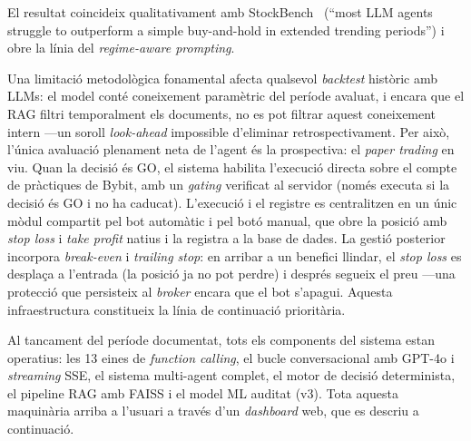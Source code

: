 \documentclass[10pt,twocolumn,a4paper]{article}
\begin{document}
El resultat coincideix qualitativament amb StockBench~\cite{stockbench2025} (``most
LLM agents struggle to outperform a simple buy-and-hold in extended trending
periods'') i obre la línia del \emph{regime-aware prompting}.

Una limitació metodològica fonamental afecta qualsevol \textit{backtest} històric
amb LLMs: el model conté coneixement paramètric del període avaluat, i encara que
el RAG filtri temporalment els documents, no es pot filtrar aquest coneixement
intern ---un soroll \textit{look-ahead} impossible d'eliminar retrospectivament. Per
això, l'única avaluació plenament neta de l'agent és la prospectiva: el
\textit{paper trading} en viu. Quan la decisió és GO, el sistema habilita l'execució
directa sobre el compte de pràctiques de Bybit, amb un \textit{gating} verificat al
servidor (només executa si la decisió és GO i no ha caducat). L'execució i el
registre es centralitzen en un únic mòdul compartit pel bot automàtic i pel botó
manual, que obre la posició amb \textit{stop loss} i \textit{take profit} natius i la
registra a la base de dades. La gestió posterior incorpora \textit{break-even} i
\textit{trailing stop}: en arribar a un benefici llindar, el \textit{stop loss} es
desplaça a l'entrada (la posició ja no pot perdre) i després segueix el preu ---una
protecció que persisteix al \textit{broker} encara que el bot s'apagui. Aquesta
infraestructura constitueix la línia de continuació prioritària.

Al tancament del període documentat, tots els components del sistema estan operatius:
les 13 eines de \textit{function calling}, el bucle conversacional amb GPT-4o i
\textit{streaming} SSE, el sistema multi-agent complet, el motor de decisió
determinista, el pipeline RAG amb FAISS i el model ML auditat (v3). Tota aquesta
maquinària arriba a l'usuari a través d'un \textit{dashboard} web, que es descriu a
continuació.

\end{document}
